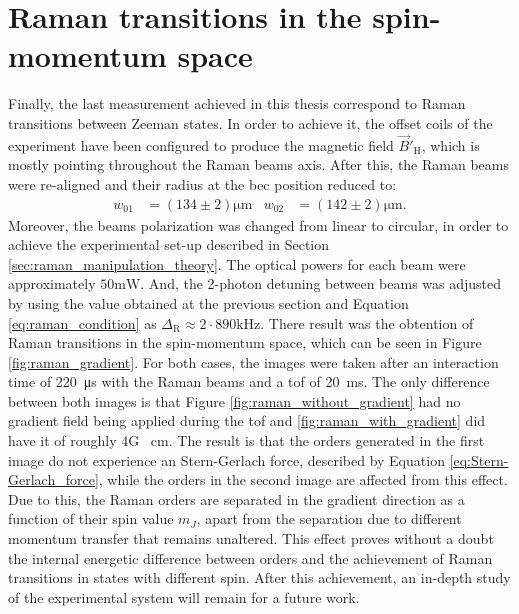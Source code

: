 \section{Raman transitions in the spin-momentum space}

Finally, the last measurement achieved in this thesis correspond to Raman transitions between Zeeman states. In order to achieve it, the offset coils of the experiment have been configured to produce the magnetic field $\vec{B}'_\text{H}$, which is mostly pointing throughout the Raman beams axis. After this, the Raman beams were re-aligned and their radius at the \ac{bec} position reduced to:
\begin{align*}
	w_{01} &= (134\pm2)\si{\micro\meter}   &   w_{02} &= (142\pm 2)\si{\micro\meter}.
\end{align*}
Moreover, the beams polarization was changed from linear to circular, in order to achieve the experimental set-up described in Section \ref{sec:raman_manipulation_theory}. The optical powers for each beam were approximately $50\si{\milli\watt}$. And, the 2-photon detuning between beams was adjusted by using the value obtained at the previous section and Equation \eqref{eq:raman_condition} as $\Delta_\text{R} \approx 2\cdot890 \si{\kilo\hertz}$. There result was the obtention of Raman transitions in the spin-momentum space, which can be seen in Figure \ref{fig:raman_gradient}. For both cases, the images were taken after an interaction time of \SI{220}{\micro\second} with the Raman beams and a \ac{tof} of \SI{20}{\milli\second}. The only difference between both images is that Figure \ref{fig:raman_without_gradient} had no gradient field being applied during the \ac{tof} and \ref{fig:raman_with_gradient} did have it of roughly 4G \si{\per\centi\meter}. The result is that the orders generated in the first image do not experience an Stern-Gerlach force, described by Equation \ref{eq:Stern-Gerlach_force}, while the orders in the second image are affected from this effect. Due to this, the Raman orders are separated in the gradient direction as a function of their spin value $m_J$, apart from the separation due to different momentum transfer that remains unaltered. This effect proves without a doubt the internal energetic difference between orders and the achievement of Raman transitions in states with different spin. After this achievement, an in-depth study of the experimental system will remain for a future work.

